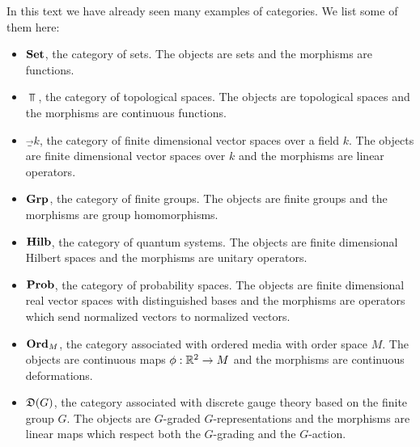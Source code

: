 \begin{ex}\label{category-examples} In this text we have already seen many examples of categories. We list some of them here:

\begin{itemize}
\item ${\bf Set}$, the category of sets. The objects are sets and the morphisms are functions.

\item $\Top$, the category of topological spaces. The objects are topological spaces and the morphisms are continuous functions.

\item $\Vec_k$, the category of finite dimensional vector spaces over a field $k$. The objects are finite dimensional vector spaces over $k$ and the morphisms are linear operators.

\item ${\bf Grp}$, the category of finite groups. The objects are finite groups and the morphisms are group homomorphisms.

\item ${\bf Hilb}$, the category of quantum systems. The objects are finite dimensional Hilbert spaces and the morphisms are unitary operators.

\item ${\bf Prob}$, the category of probability spaces. The objects are finite dimensional real vector spaces with distinguished bases and the morphisms are operators which send normalized vectors to normalized vectors.

\item ${\bf Ord}_M$, the category associated with ordered media with order space $M$. The objects are continuous maps $\phi: {\mathbb R}^2\to M$ and the morphisms are continuous deformations.

\item ${\mathfrak D}(G)$, the category associated with discrete gauge theory based on the finite group $G$. The objects are $G$-graded $G$-representations and the morphisms are linear maps which respect both the $G$-grading and the $G$-action.

\end{itemize}
\end{ex}

